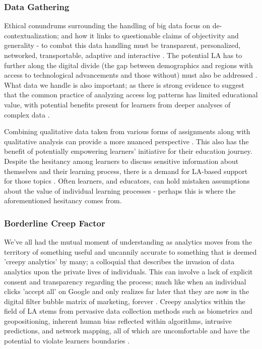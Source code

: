 \documentclass{l4proj}
\begin{document}
\subsubsection{Data Gathering}
\hfill

Ethical conundrums surrounding the handling of big data focus on de-contextualization; and how it links to questionable claims of objectivity and generality - to combat this data handling must be transparent, personalized, networked, transportable, adaptive and interactive \citep{BeattieCreepyRights}. The potential LA has to further along the digital divide (the gap between demographics and regions with access to technological advancements and those without) must also be addressed \citep{BeattieCreepyRights}. What data we handle is also important; as there is strong evidence to suggest that the common practice of analyzing access log patterns has limited educational value, with potential benefits present for learners from deeper analyses of complex data \citep{Dietrichson2013BeyondPedagogies}. 

Combining qualitative data taken from various forms of assignments along with qualitative analysis can provide a more nuanced perspective \citep{Martinez2023Content-FocusedData}. This also has the benefit of potentially empowering learners' initiative for their education journey. Despite the hesitancy among learners to discuss sensitive information about themselves and their learning process, there is a demand for LA-based support for those topics \citep{MerikkoTechnologicalProcess}. Often learners, and educators, can hold mistaken assumptions about the value of individual learning processes - perhaps this is where the aforementioned hesitancy comes from. 


\subsubsection{Borderline Creep Factor}
\hfill

We've all had the mutual moment of understanding as analytics moves from the territory of something useful and uncannily accurate to something that is deemed 'creepy analytics' by many; a colloquial that describes the invasion of data analytics upon the private lives of individuals. This can involve a lack of explicit consent and transparency regarding the process; much like when an individual clicks 'accept all' on Google and only realizes far later that they are now in the digital filter bubble matrix of marketing, forever \citep{Arthur_2013}. Creepy analytics within the field of LA stems from pervasive data collection methods such as biometrics and geopositioning, inherent human bias reflected within algorithms, intrusive predictions, and network mapping, all of which are uncomfortable and have the potential to violate learners boundaries \citep{BeattieCreepyRights}. 
\end{document}
